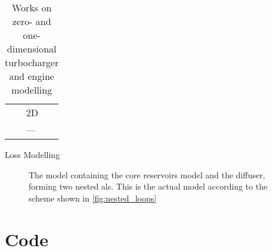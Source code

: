 \begin{appendices}
\begin{table}
{\begin{subfloatrow}
{\begin{tabular}{@{}m{}m{}@{}}
		\textcite{schneider_analytical_2015} & 2D\\
		\textcite{solaesa_analytical_2016} & ---\\
	\bottomrule
	\end{tabular}
}%
{%
	\caption{Loss Modelling}%
	\label{tab:works_losses}%
}%
\end{subfloatrow}%
}%
{%
\caption[Works on zero- and one-dimensional modelling]
{%
	Works on zero- and one-dimensional turbocharger and engine modelling%
}%
\label{tab:works_on_turbocharging}%
}%
\end{table}

\clearpage

\begin{figure}
{
\caption[Simulink Model with two Algebraic Loops]%
{%
	The \smlnk{} model containing the core reservoirs model and the diffuser, forming two nested \glspl{al}.
	This is the actual \smlnk{} model according to the scheme shown in \cref{fig:nested_loops}%
}%
\label{fig:nested_loops_sim}
}
\end{figure}

\clearpage

\section{Code}



\end{appendices}

%
%
%

